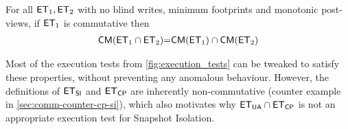 \begin{theorem}[Compositionality]     
For all $\mathsf{ET}_1, \mathsf{ET}_2$ with no blind writes, minimum footprints and monotonic post-views, 
if $\mathsf{ET}_1$ is commutative then
\begin{align*}
 \mathsf{CM}(\mathsf{ET}_1 \cap \mathsf{ET}_2) {=} \mathsf{CM}(\mathsf{ET}_1) \cap \mathsf{CM}(\mathsf{ET}_2)
\end{align*}
\end{theorem}
Most of the execution tests from \cref{fig:execution_tests} can be tweaked to satisfy these 
properties, without preventing any anomalous behaviour. However, the definitions 
of $\mathsf{ET}_{\mathsf{SI}}$ and $\mathsf{ET}_{\mathsf{CP}}$ are inherently non-commutative (counter example in \cref{sec:comm-counter-cp-si}), which also motivates 
why $\mathsf{ET}_{\mathsf{UA}} \cap \mathsf{ET}_{\mathsf{CP}}$ is not an appropriate execution test for Snapshot Isolation.


